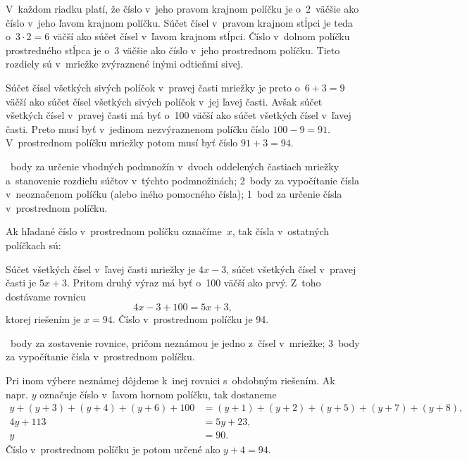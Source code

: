 {%
V~každom riadku platí, že číslo v~jeho pravom krajnom políčku je o~2~väčšie ako číslo v~jeho ľavom krajnom políčku.
Súčet čísel v~pravom krajnom stĺpci je teda o~${3\cdot2}=6$ väčší ako súčet čísel v~ľavom krajnom stĺpci.
Číslo v~dolnom políčku prostredného stĺpca je o~3 väčšie ako číslo v~jeho prostrednom políčku.
Tieto rozdiely sú v~mriežke zvýraznené inými odtieňmi sivej.
%

Súčet čísel všetkých sivých políčok v~pravej časti mriežky je preto o~$6+3=9$ väčší ako súčet čísel všetkých sivých políčok v~jej ľavej časti.
Avšak súčet všetkých čísel v~pravej časti má byť o~100 väčší ako súčet všetkých čísel v~ľavej časti.
Preto musí byť v~jedinom nezvýraznenom políčku číslo $100-9=91$.
V~prostrednom políčku mriežky potom musí byť číslo $91+3=94$.

~body za určenie vhodných podmnožín v~dvoch oddelených častiach mriežky a~stanovenie rozdielu súčtov v~týchto podmnožinách;
2~body za vypočítanie čísla v~neoznačenom políčku (alebo iného pomocného čísla);
1~bod za určenie čísla v~prostrednom políčku.
\endhodnotenie

\ineriesenie
Ak hľadané číslo v~prostrednom políčku označíme~$x$, tak čísla v~ostatných políčkach sú:
%

Súčet všetkých čísel v~ľavej časti mriežky je $4x-3$, súčet všetkých čísel v~pravej časti je $5x+3$.
Pritom druhý výraz má byť o~100 väčší ako prvý.
Z~toho dostávame rovnicu
$$
4x-3+100=5x+3,
$$
ktorej riešením je $x=94$.
Číslo v~prostrednom políčku je 94.

~body za zostavenie rovnice, pričom neznámou je jedno z~čísel v~mriežke;
3~body za vypočítanie čísla v~prostrednom políčku.
\endhodnotenie

\poznamka
Pri inom výbere neznámej dôjdeme k~inej rovnici s~obdobným riešením.
Ak napr. $y$ označuje číslo v~ľavom hornom políčku, tak dostaneme
$$
\begin{aligned}
\!y+(y+3)+(y+4)+(y+6)+100&=\!(y+1)+(y+2)+(y+5)+(y+7)+(y+8), \\
4y+113&=5y+23, \\
y&=90.
\end{aligned}
$$
Číslo v~prostrednom políčku je potom určené ako $y+4=94$.
}


